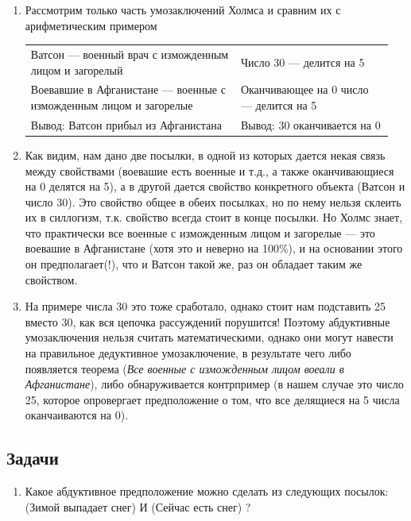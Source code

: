 \begin{enumerate}
\item Рассмотрим только часть умозаключений Холмса и сравним их с арифметическим примером\hfill\;

\begin{tabular}{p{0.55\linewidth}p{0.4\linewidth}}\hline
Ватсон --- военный врач с изможденным лицом и загорелый & 
Число 30 --- делится на 5 \\
Воевавшие в Афганистане --- военные с изможденным лицом и загорелые &
Оканчивающее на 0 число --- делится на 5 \\\hline

Вывод: Ватсон прибыл из Афганистана & Вывод: 30 оканчивается на 0\\\hline
\end{tabular}

\item Как видим, нам дано две посылки, в одной из которых дается некая связь между свойствами (воевашие есть военные и т.д., а также оканчивающиеся на 0 делятся на 5), а в другой дается свойство конкретного объекта (Ватсон и число 30). Это свойство общее в обеих посылках, но по нему нельзя склеить их в силлогизм, т.к. свойство всегда стоит в конце посылки. Но Холмс знает, что практически все военные с изможденным лицом и загорелые --- это воевашие в Афганистане (хотя это и неверно на 100\%), и на основании этого он предполагает(!), что и Ватсон такой же, раз он обладает таким же свойством.

\item На примере числа 30 это тоже сработало, однако стоит нам подставить 25 вместо 30, как вся цепочка рассуждений порушится! Поэтому абдуктивные умозаключения нельзя считать математическими, однако они могут навести на правильное дедуктивное умозаключение, в результате чего либо появляется теорема (\textit{Все военные с изможденным лицом воеали в Афганистане}), либо обнаруживается контрпример (в нашем случае это число 25, которое опровергает предположение о том, что все делящиеся на 5 числа оканчаиваются на 0).
\end{enumerate}

\subsection{Задачи}
\begin{enumerate}
\item Какое абдуктивное предположение можно сделать из следующих посылок: (Зимой выпадает снег) И (Сейчас есть снег) ?
\end{enumerate}


